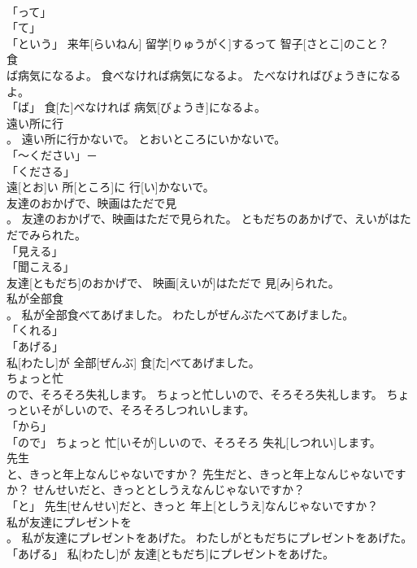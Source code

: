\documentclass[8pt]{extreport}
\begin{document}
\begin{CJK}{UTF8}{min}
\\	「って」 
\\	「て」 
\\	「という」	来年[らいねん] 留学[りゅうがく]するって 智子[さとこ]のこと？		
\\	食
\\	ば病気になるよ。	食べなければ病気になるよ。	たべなければびょうきになるよ。	
\\	「ば」	食[た]べなければ 病気[びょうき]になるよ。		
\\	遠い所に行
\\	。	遠い所に行かないで。	とおいところにいかないで。	
\\	「～ください」－ 
\\	「くださる」　
\\	遠[とお]い 所[ところ]に 行[い]かないで。		
\\	友達のおかげで、映画はただで見
\\	。	友達のおかげで、映画はただで見られた。	ともだちのあかげで、えいがはただでみられた。	
\\	「見える」 
\\	「聞こえる」 
\\	友達[ともだち]のおかげで、 映画[えいが]はただで 見[み]られた。		
\\	私が全部食
\\	。	私が全部食べてあげました。	わたしがぜんぶたべてあげました。	
\\	「くれる」 
\\	「あげる」 
\\	私[わたし]が 全部[ぜんぶ] 食[た]べてあげました。		
\\	ちょっと忙
\\	ので、そろそろ失礼します。	ちょっと忙しいので、そろそろ失礼します。	ちょっといそがしいので、そろそろしつれいします。	
\\	「から」 
\\	「ので」	ちょっと 忙[いそが]しいので、そろそろ 失礼[しつれい]します。		
\\	先生
\\	と、きっと年上なんじゃないですか？	先生だと、きっと年上なんじゃないですか？	せんせいだと、きっととしうえなんじゃないですか？	
\\	「と」	先生[せんせい]だと、きっと 年上[としうえ]なんじゃないですか？		
\\	私が友達にプレゼントを
\\	。	私が友達にプレゼントをあげた。	わたしがともだちにプレゼントをあげた。	
\\	「あげる」	私[わたし]が 友達[ともだち]にプレゼントをあげた。		

\end{CJK}
\end{document}
